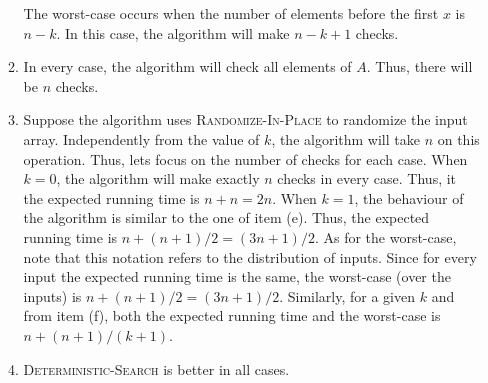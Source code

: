\begin{enumerate}
\begin{framed}
\begin{enumerate}
The worst-case occurs when the number of elements before the first $x$ is
$n - k$. In this case, the algorithm will make $n - k + 1$ checks.

\item In every case, the algorithm will check all elements of $A$. Thus, there
will be $n$ checks.

\item Suppose the algorithm uses \textsc{Randomize-In-Place} to randomize the
input array. Independently from the value of $k$, the algorithm will take
$n$ on this operation. Thus, lets focus on the number of checks for each
case. When $k = 0$, the algorithm will make exactly $n$ checks in every case.
Thus, it the expected running time is $n + n = 2n$. When $k = 1$, the
behaviour of the algorithm is similar to the one of item (e). Thus, the expected
running time is $n + (n + 1)/2 = (3n + 1)/2$. As for the worst-case, note that
this notation refers to the distribution of inputs.  Since for every input the
expected running time is the same, the worst-case (over the inputs) is
$n + (n + 1)/2 = (3n + 1)/2$. Similarly, for a given $k$ and from item (f),
both the expected running time and the worst-case is $n + (n + 1)/(k + 1)$.

\item \textsc{Deterministic-Search} is better in all cases.
\end{enumerate}
\end{framed}

\end{enumerate}

